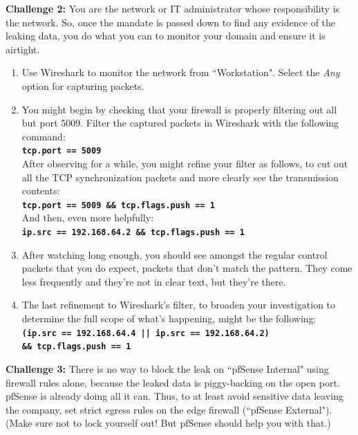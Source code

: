 \documentclass[12pt]{extarticle}
\begin{document}
\noindent
\textbf{Challenge 2:}
\noindent
You are the network or IT administrator whose responsibility is the network. So, once the mandate is passed down to find any evidence of the leaking data, you do what you can to monitor your domain and ensure it is airtight.

\begin{enumerate}
	\item Use Wireshark to monitor the network from ``Workstation". Select the \textit{Any} option for capturing packets.
	\item You might begin by checking that your firewall is properly filtering out all but port 5009. Filter the captured packets in Wireshark with the following command:\\
	
	\texttt{\textbf{tcp.port == 5009}}\\
	
	After observing for a while, you might refine your filter as follows, to cut out all the TCP synchronization packets and more clearly see the transmission contents:\\
	
	\texttt{\textbf{tcp.port == 5009 \&\& tcp.flags.push == 1}}\\
	
	And then, even more helpfully:\\
	\texttt{\textbf{ip.src == 192.168.64.2 \&\& tcp.flags.push == 1}}\\
	
	\item After watching long enough, you should see amongst the regular control packets that you do expect, packets that don't match the pattern. They come less frequently and they're not in clear text, but they're there.
	
	\item The last refinement to Wireshark's filter, to broaden your investigation to determine the full scope of what's happening, might be the following:\\
	
	\texttt{\textbf{(ip.src == 192.168.64.4 || ip.src == 192.168.64.2) \\\&\& tcp.flags.push == 1}}
	
\end{enumerate}


\noindent
\textbf{Challenge 3:}
\noindent
There is no way to block the leak on ``pfSense Internal" using firewall rules alone, because the leaked data is piggy-backing on the open port. pfSense is already doing all it can. Thus, to at least avoid sensitive data leaving the company, set strict egress rules on the edge firewall (``pfSense External"). (Make sure not to lock yourself out! But pfSense should help you with that.)
\end{document}
